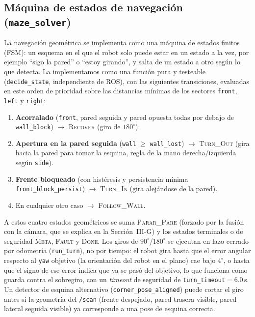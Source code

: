 \documentclass[conference]{IEEEtran}
\begin{document}
\subsection{Máquina de estados de navegación (\texttt{maze\_solver})}
La navegación geométrica se implementa como una máquina de estados finitos (FSM): un esquema en el que el robot solo puede estar en un estado a la vez, por ejemplo ``sigo la pared'' o ``estoy girando'', y salta de un estado a otro según lo que detecta. La implementamos como una función pura y testeable (\texttt{decide\_state}, independiente de ROS), con las siguientes transiciones, evaluadas en este orden de prioridad sobre las distancias mínimas de los sectores \texttt{front}, \texttt{left} y \texttt{right}:

\begin{enumerate}
  \item \textbf{Acorralado} (\texttt{front}, pared seguida y pared opuesta todas por debajo de \texttt{wall\_block}) $\rightarrow$ \textsc{Recover} (giro de $180^\circ$).
  \item \textbf{Apertura en la pared seguida} (\texttt{wall} $\geq$ \texttt{wall\_lost}) $\rightarrow$ \textsc{Turn\_Out} (gira hacia la pared para tomar la esquina, regla de la mano derecha/izquierda según \texttt{side}).
  \item \textbf{Frente bloqueado} (con histéresis y persistencia mínima \texttt{front\_block\_persist}) $\rightarrow$ \textsc{Turn\_In} (gira alejándose de la pared).
  \item En cualquier otro caso $\rightarrow$ \textsc{Follow\_Wall}.
\end{enumerate}

A estos cuatro estados geométricos se suma \textsc{Parar\_Pare} (forzado por la fusión con la cámara, que se explica en la Sección~III-G) y los estados terminales o de seguridad \textsc{Meta}, \textsc{Fault} y \textsc{Done}. Los giros de $90^\circ$/$180^\circ$ se ejecutan en lazo cerrado por odometría (\texttt{run\_turn}), no por tiempo: el robot gira hasta que el error angular respecto al \texttt{yaw} objetivo (la orientación del robot en el plano) cae bajo $4^\circ$, o hasta que el signo de ese error indica que ya se pasó del objetivo, lo que funciona como guarda contra el sobregiro, con un \emph{timeout} de seguridad de \texttt{turn\_timeout}$=6.0$\,s. Un detector de esquina alternativo (\texttt{corner\_pose\_aligned}) puede cortar el giro antes si la geometría del \texttt{/scan} (frente despejado, pared trasera visible, pared lateral seguida visible) ya corresponde a una pose de esquina correcta.
\end{document}
